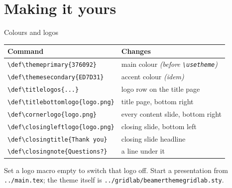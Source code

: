 \documentclass[aspectratio=169,10pt]{beamer}
\begin{document}
\section{Making it yours}

\begin{frame}[fragile]{Colours and logos}
  \centering
  \footnotesize
  \renewcommand{\arraystretch}{1.35}
  \begin{tabular}{@{}l@{\qquad}l@{}}
    \toprule
    \textbf{Command} & \textbf{Changes} \\
    \midrule
    \verb|\def\themeprimary{376092}| & main colour \emph{(before \texttt{\textbackslash usetheme})} \\
    \verb|\def\themesecondary{ED7D31}| & accent colour \emph{(idem)} \\
    \midrule
    \verb|\def\titlelogos{...}| & logo row on the title page \\
    \verb|\def\titlebottomlogo{logo.png}| & title page, bottom right \\
    \verb|\def\cornerlogo{logo.png}| & every content slide, bottom right \\
    \verb|\def\closingleftlogo{logo.png}| & closing slide, bottom left \\
    \midrule
    \verb|\def\closingtitle{Thank you}| & closing slide headline \\
    \verb|\def\closingnote{Questions?}| & a line under it \\
    \bottomrule
  \end{tabular}

  \vspace{0.5em}
  {\footnotesize Set a logo macro empty to switch that logo off. Start a
   presentation from \texttt{../main.tex}; the theme itself is
   \texttt{../gridlab/beamerthemegridlab.sty}.}
\end{frame}

\def\closingnote{Slides and theme: \texttt{gridlab-templates/beamer}}
\closingslide
\end{document}

